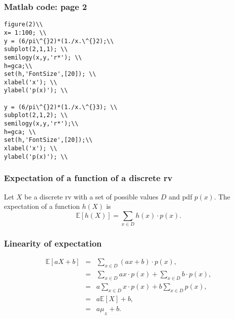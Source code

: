 \begin{frame}[fragile]\frametitle{Matlab code: page 2}

{\tiny

\begin{lstlisting}
figure(2)\\ 
x= 1:100; \\
y = (6/pi\^{}2)*(1./x.\^{}2);\\
subplot(2,1,1); \\
semilogy(x,y,'r*'); \\
h=gca;\\
set(h,'FontSize',[20]); \\
xlabel('x'); \\ 
ylabel('p(x)'); \\
 
y = (6/pi\^{}2)*(1./x.\^{}3); \\
subplot(2,1,2); \\
semilogy(x,y,'r*');\\
h=gca; \\
set(h,'FontSize',[20]);\\
xlabel('x'); \\
ylabel('p(x)'); \\
\end{lstlisting}
}
\end{frame}



\begin{frame}[fragile]\frametitle{Expectation of a function of a discrete rv}

\begin{prop}
Let $X$ be a discrete rv with a set of possible values $D$ and pdf
$p(x)$. The expectation of a function $h(X)$ is
$$ \mathbb E[h(X)] = \sum_{x \in D} h(x) \cdot p(x).$$
\end{prop}

\end{frame}


\begin{frame}[fragile]\frametitle{Linearity of expectation}

\begin{prop}
\begin{eqnarray*}
\mathbb E[aX+b] &=& \sum_{x \in D} (ax+b) \cdot p(x), \\ 
 & = & \sum_{x \in D} ax \cdot p(x)+ \sum_{x \in D} b \cdot p(x),\\  
  & = & a \sum_{x \in D} x \cdot p(x)+ b \sum_{x \in D} p(x),\\ 
  & = & a \mathbb E[X]+ b ,\\ 
& = & a \mu_{_X}+ b.
\end{eqnarray*}
\end{prop}

\end{frame}



